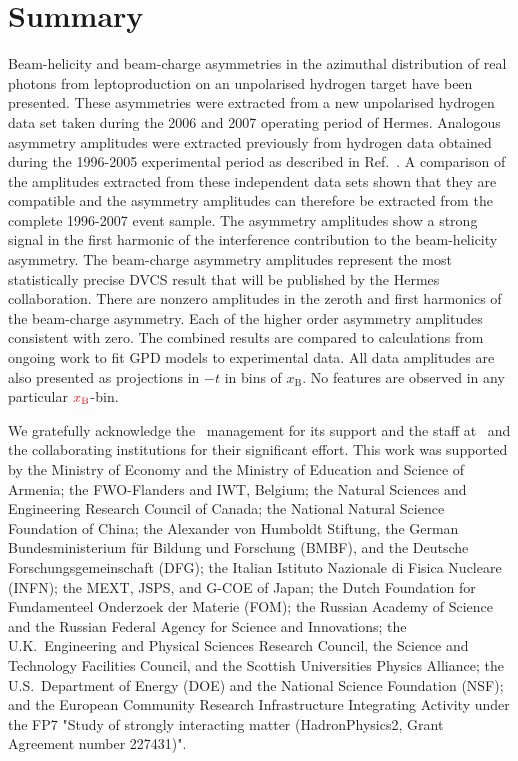\section{Summary}

Beam-helicity and beam-charge asymmetries in the azimuthal distribution of real photons from leptoproduction on an unpolarised hydrogen target have been presented. These asymmetries were extracted from a new unpolarised hydrogen data set taken during the 2006 and 2007 operating period of H{\sc ermes}. Analogous asymmetry amplitudes were extracted previously from hydrogen data obtained during the 1996-2005 experimental period as described in Ref.~\cite{Air09}. A comparison of the amplitudes extracted from these independent data sets  shown that they are compatible and the asymmetry amplitudes can therefore be extracted from the complete 1996-2007 event sample. The  asymmetry amplitudes show a strong signal in the first harmonic of the interference contribution to the beam-helicity asymmetry. The beam-charge asymmetry amplitudes represent the most statistically precise DVCS result that will be published by the H{\sc ermes} collaboration. There are non\red{-}zero amplitudes in the zeroth and first harmonics of the beam-charge asymmetry. Each of the higher order asymmetry amplitudes  consistent with zero. The combined results are compared to calculations from ongoing work to fit GPD models to experimental data. All data amplitudes are also presented as projections in $-t$ in bins of $x_{\textrm{B}}$. No  features are observed in any particular ${\color{red}{x_{\textrm{B}}}\color{black}}$-bin.

\acknowledgments
We gratefully acknowledge the \desy\ management for its support and the staff
at \desy\ and the collaborating institutions for their significant effort.
This work was supported by 
the Ministry of Economy and the Ministry of Education and Science of Armenia;
the FWO-Flanders and IWT, Belgium;
the Natural Sciences and Engineering Research Council of Canada;
the National Natural Science Foundation of China;
the Alexander von Humboldt Stiftung,
the German Bundesministerium f\"ur Bildung und Forschung (BMBF), and
the Deutsche Forschungsgemeinschaft (DFG);
the Italian Istituto Nazionale di Fisica Nucleare (INFN);
the MEXT, JSPS, and G-COE of Japan;
the Dutch Foundation for Fundamenteel Onderzoek der Materie (FOM);
the Russian Academy of Science and the Russian Federal Agency for 
Science and Innovations;
the U.K.~Engineering and Physical Sciences Research Council, 
the Science and Technology Facilities Council,
and the Scottish Universities Physics Alliance;
the U.S.~Department of Energy (DOE) and the National Science Foundation (NSF);
and the European Community Research Infrastructure Integrating Activity
under the FP7 "Study of strongly interacting matter (HadronPhysics2, Grant
Agreement number 227431)".

